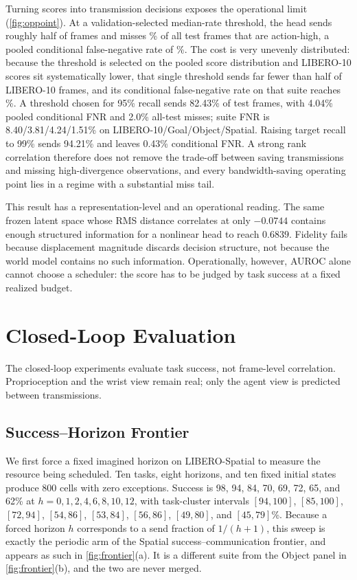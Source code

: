 \documentclass[sigconf,10pt,anonymous,review]{acmart}
\begin{document}
Turning scores into transmission decisions exposes the operational limit
(\cref{fig:oppoint}). At a validation-selected median-rate threshold, the
head sends roughly half of frames and misses \opMedMiss\% of all test frames
that are action-high, a pooled conditional false-negative rate of
\opMedFNR\%. The cost is very unevenly distributed: because the threshold is
selected on the pooled score distribution and LIBERO-10 scores sit
systematically lower, that single threshold sends far fewer than half of
LIBERO-10 frames, and its conditional false-negative rate on that suite
reaches \opMedFNRLTen\%. A threshold chosen for 95\% recall sends 82.43\% of
test frames, with 4.04\% pooled conditional FNR and 2.0\% all-test misses;
suite FNR is 8.40/3.81/4.24/1.51\% on LIBERO-10/Goal/Object/Spatial. Raising
target recall to 99\% sends 94.21\% and leaves 0.43\% conditional FNR. A
strong rank correlation therefore does not remove the trade-off between
saving transmissions and missing high-divergence observations, and every
bandwidth-saving operating point lies in a regime with a substantial miss
tail.

This result has a representation-level and an operational reading. The same
frozen latent space whose RMS distance correlates at only $-0.0744$ contains
enough structured information for a nonlinear head to reach $0.6839$.
Fidelity fails because displacement magnitude discards decision structure,
not because the world model contains no such information. Operationally, however, AUROC alone cannot choose a scheduler: the score has
to be judged by task success at a fixed realized budget.

\section{Closed-Loop Evaluation}

The closed-loop experiments evaluate task success, not frame-level
correlation. Proprioception and the wrist view remain real; only the agent
view is predicted between transmissions.

\subsection{Success--Horizon Frontier}
\label{sec:frontier}
We first force a fixed imagined horizon on LIBERO-Spatial to measure the
resource being scheduled. Ten tasks, eight horizons, and ten fixed initial
states produce 800 cells with zero exceptions. Success is 98,
94, 84, 70, 69, 72, 65, and 62\% at $h=0,1,2,4,6,8,10,12$, with task-cluster
intervals $[94,100]$, $[85,100]$, $[72,94]$, $[54,86]$, $[53,84]$, $[56,86]$,
$[49,80]$, and $[45,79]$\%. Because a forced horizon $h$ corresponds to a send
fraction of $1/(h+1)$, this sweep is exactly the periodic arm of the Spatial
success--communication frontier, and appears as such in
\cref{fig:frontier}(a). It is a different suite from the Object panel in
\cref{fig:frontier}(b), and the two are never merged.
\end{document}
